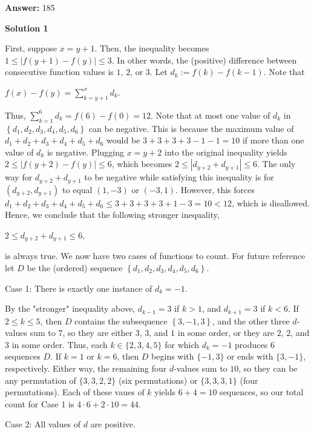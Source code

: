 \begin{enumerate}
 
 \textbf{Answer: }185



\textbf{Solution 1}

First, suppose $x = y + 1$. Then, the inequality becomes $1 \leq |f(y + 1) - f(y)| \leq 3$. In other words, the (positive) difference between consecutive function values is $1$, $2$, or $3$. Let $d_k := f(k) - f(k - 1)$. Note that

 $f(x) - f(y) = \sum_{k=y+1}^{x} d_k.$

 Thus, $\sum_{k=1}^{6} d_k = f(6) - f(0) = 12$. Note that at most one value of $d_k$ in $\left\{d_1, d_2, d_3, d_4, d_5, d_6\right\}$ can be negative. This is because the maximum value of $d_1 + d_2 + d_3 + d_4 + d_5 + d_6$ would be $3 + 3 + 3 + 3 - 1 - 1 = 10$ if more than one value of $d_k$ is negative. Plugging $x = y + 2$ into the original inequality yields $2 \leq |f(y + 2) - f(y)| \leq 6$, which becomes $2 \leq \left|d_{y+2} + d_{y+1}\right| \leq 6$. The only way for $d_{y+2} + d_{y+1}$ to be negative while satisfying this inequality is for $\left(d_{y+2}, d_{y+1}\right)$ to equal $(1, -3)$ or $(-3, 1)$. However, this forces $d_1 + d_2 + d_3 + d_4 + d_5 + d_6 \leq 3 + 3 + 3 + 3 + 1 - 3 = 10 < 12$, which is disallowed. Hence, we conclude that the following stronger inequality,

 $2 \leq d_{y + 2} + d_{y + 1} \leq 6,$

 is always true. We now have two cases of functions to count. For future reference let $D$ be the (ordered) sequence $\left\{d_1, d_2, d_3, d_4, d_5, d_6\right\}$.

 Case 1: There is exactly one instance of $d_k = -1$.

 By the "stronger" inequality above, $d_{k-1} = 3$ if $k > 1$, and $d_{k+1} = 3$ if $k < 6$. If $2 \leq k \leq 5$, then $D$ contains the subsequence $\left\{3, -1, 3\right\}$, and the other three $d$-values sum to $7$, so they are either $3$, $3$, and $1$ in some order, or they are $2$, $2$, and $3$ in some order. Thus, each $k \in \{2, 3, 4, 5\}$ for which $d_k = -1$ produces $6$ sequences $D$. If $k = 1$ or $k = 6$, then $D$ begins with $\{-1, 3\}$ or ends with $\{3, -1\}$, respectively. Either way, the remaining four $d$-values sum to $10$, so they can be any permutation of $\{3, 3, 2, 2\}$ (six permutations) or $\{3, 3, 3, 1\}$ (four permutations). Each of these vaues of $k$ yields $6 + 4 = 10$ sequences, so our total count for Case 1 is $4 \cdot 6 + 2 \cdot 10 = 44$.

 Case 2: All values of $d$ are positive.


\end{enumerate}
